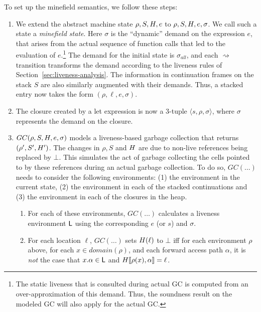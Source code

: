 \documentclass[9pt,nonatbib]{sigplanconf}
\begin{document}
\noindent To set up the minefield semantics, we follow these steps:
\begin{enumerate}

\item  We  extend  the  abstract  machine  state  $\rho,S,H,e$  to
  $\rho,S,H,e,\sigma$.   We call  such a  state a  \emph{minefield
  state}.  Here $\sigma$  is the ``dynamic'' demand  on the expression
  $e$, that arises from the actual sequence of function calls that led
  to  the  evaluation of  $e$.\footnote{The  static  liveness that  is
    consulted during actual GC  is computed from an over-approximation
    of this demand.  Thus, the soundness  result on the modeled GC will
    also apply for the actual GC.} The demand for the initial state is
  $\sigma_{\mathit  {all}}$,  and each  $\rightsquigarrow$  transition
  transforms   the  demand   according  to   the  liveness   rules  of
  Section~\ref{sec:liveness-analysis}.      The     information     in
  continuation frames  on the stack  $S$ are also  similarly augmented
  with their demands.  Thus, a stacked entry now takes the form $(\rho,
  \ell, e, \sigma)$.

\item The closure created by a let expression is now a 3-tuple
  $\langle s,  \rho, \sigma \rangle$, where $\sigma$ represents the
  demand on the closure. 

\item  $GC(\rho,  S,  H,  e, \sigma)$ models  a  liveness-based  garbage
  collection that returns $(\rho', S', H')$. The changes in
  $\rho, S$ and  $H$ are due
  to non-live references being replaced by $\bot$.  This simulates the
  act of  garbage collecting  the cells
  pointed to by these references  during an actual garbage collection.
  To do so, $GC(\ldots)$ needs to consider the following environments:  (1) the  environment in  the
  current state, (2) the  environment in each of the stacked  continuations and (3)
  the environment  in each of  the closures in  the heap.
  
 \begin{enumerate} 
 \item \label{env}  For each of  these environments, $GC(\ldots)$  calculates a
   liveness  environment $\mathsf{L}$  using  the  corresponding  $e$  (or  $s$)  and
   $\sigma$.
 \item 
   For each
    location $\ell$,  $GC(\ldots)$  sets $H(\ell)$  to $\bot$ iff for each
    environment $\rho$ above, for each $x \in domain(\rho)$, and each forward
    access
    path $\alpha$, it is \emph{not} the case that $x.\alpha \in \mathsf{L}$ and $H\llbracket\rho(x), \alpha
    \rrbracket = \ell$. 


\end{enumerate}
\end{enumerate}
\end{document}
